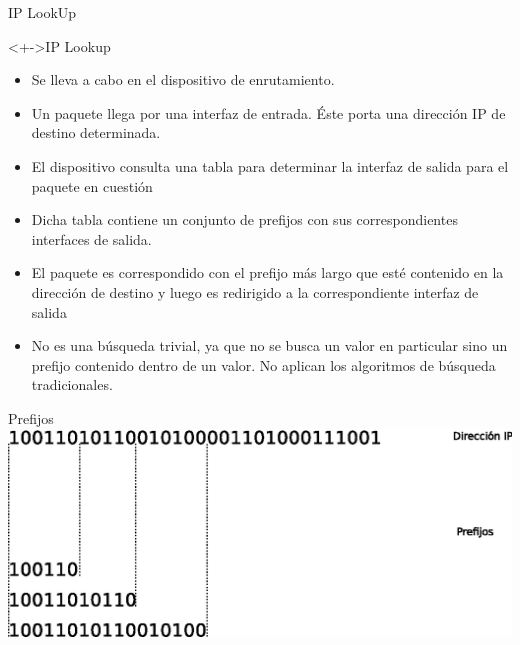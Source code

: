 \documentclass[xcolor=dvipsnames]{beamer}
\begin{document}
\begin{frame}{IP LookUp}
 \begin{block}<+->{IP Lookup}   
    \begin{itemize}
      \scriptsize
      \item Se lleva a cabo en el dispositivo de enrutamiento.
      \item Un paquete llega por una interfaz de entrada. Éste porta una dirección IP de destino determinada.
      \item El dispositivo consulta una tabla para determinar la interfaz de salida para el paquete en cuestión
      \item Dicha tabla contiene un conjunto de prefijos con sus correspondientes interfaces de salida.
      \item El paquete es correspondido con el prefijo más largo que esté contenido en la dirección de destino y luego es redirigido  a la correspondiente interfaz de salida
      \item No es una búsqueda trivial, ya que no se busca un valor en particular sino un prefijo contenido dentro de un valor. No aplican los algoritmos de búsqueda tradicionales.   
    \end{itemize}
  \end{block}
\end{frame}

\begin{frame}{Prefijos}
\center 
\includegraphics[scale=0.75]{figures/prefijos.eps}
\end{frame}
\end{document}
